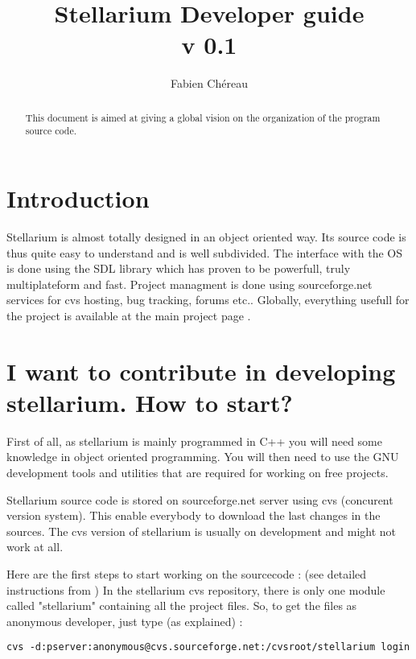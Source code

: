 \documentclass[11pt,oneside] {article}
\begin{document}
\title{\textbf{Stellarium Developer guide} \\{v 0.1}}
\author{Fabien Ch\'ereau}

\maketitle

\begin{abstract}
This document is aimed at giving a global vision on the organization of the program source code.
\end{abstract}

\section{Introduction}
Stellarium is almost totally designed in an object oriented way. Its source code is thus quite easy to understand and is well subdivided.
The interface with the OS is done using the SDL library which has proven to be powerfull, truly multiplateform and fast.
Project managment is done using sourceforge.net services for cvs hosting, bug tracking, forums etc.. Globally, everything usefull for the project is available at the main project page .

\section{I want to contribute in developing stellarium. How to start?}
First of all, as stellarium is mainly programmed in C++ you will need some knowledge in object oriented programming.
You will then need to use the GNU development tools and utilities that are required for working on free projects.

Stellarium source code is stored on sourceforge.net server using cvs (concurent version system). This enable everybody to download the last changes in the sources. The cvs version of stellarium is usually on development and might not work at all.


Here are the first steps to start working on the sourcecode : (see detailed instructions from )
In the stellarium cvs repository, there is only one module called "stellarium"
containing all the project files. So, to get the files as anonymous developer, just type (as explained) :

{\tt cvs -d:pserver:anonymous@cvs.sourceforge.net:/cvsroot/stellarium login}
\end{document}
